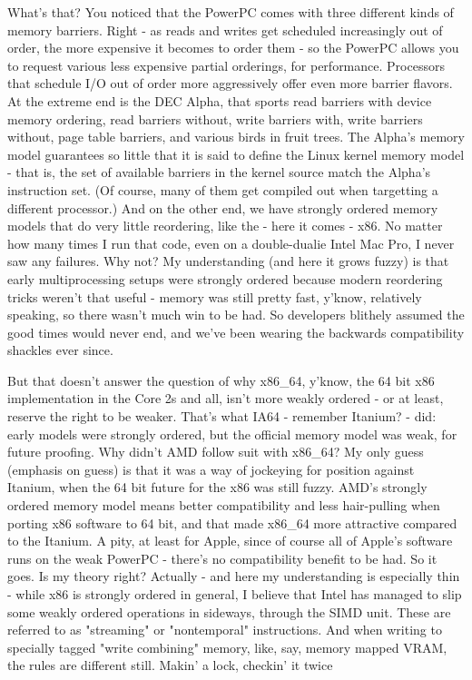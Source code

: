 {{{{What's that? You noticed that the PowerPC comes with three different kinds of memory barriers. Right - as reads and writes get scheduled increasingly out of order, the more expensive it becomes to order them - so the PowerPC allows you to request various less expensive partial orderings, for performance. Processors that schedule I/O out of order more aggressively offer even more barrier flavors. At the extreme end is the DEC Alpha, that sports read barriers with device memory ordering, read barriers without, write barriers with, write barriers without, page table barriers, and various birds in fruit trees. The Alpha's memory model guarantees so little that it is said to define the Linux kernel memory model - that is, the set of available barriers in the kernel source match the Alpha's instruction set. (Of course, many of them get compiled out when targetting a different processor.) 
And on the other end, we have strongly ordered memory models that do very little reordering, like the - here it comes - x86. No matter how many times I run that code, even on a double-dualie Intel Mac Pro, I never saw any failures. Why not? My understanding (and here it grows fuzzy) is that early multiprocessing setups were strongly ordered because modern reordering tricks weren't that useful - memory was still pretty fast, y'know, relatively speaking, so there wasn't much win to be had. So developers blithely assumed the good times would never end, and we've been wearing the backwards compatibility shackles ever since.

But that doesn't answer the question of why x86_64, y'know, the 64 bit x86 implementation in the Core 2s and all, isn't more weakly ordered - or at least, reserve the right to be weaker. That's what IA64 - remember Itanium? - did: early models were strongly ordered, but the official memory model was weak, for future proofing. Why didn't AMD follow suit with x86_64? My only guess (emphasis on guess) is that it was a way of jockeying for position against Itanium, when the 64 bit future for the x86 was still fuzzy. AMD's strongly ordered memory model means better compatibility and less hair-pulling when porting x86 software to 64 bit, and that made x86_64 more attractive compared to the Itanium. A pity, at least for Apple, since of course all of Apple's software runs on the weak PowerPC - there's no compatibility benefit to be had. So it goes. Is my theory right? 
Actually - and here my understanding is especially thin - while x86 is strongly ordered in general, I believe that Intel has managed to slip some weakly ordered operations in sideways, through the SIMD unit. These are referred to as "streaming" or "nontemporal" instructions. And when writing to specially tagged "write combining" memory, like, say, memory mapped VRAM, the rules are different still.
Makin' a lock, checkin' it twice

}}}}

